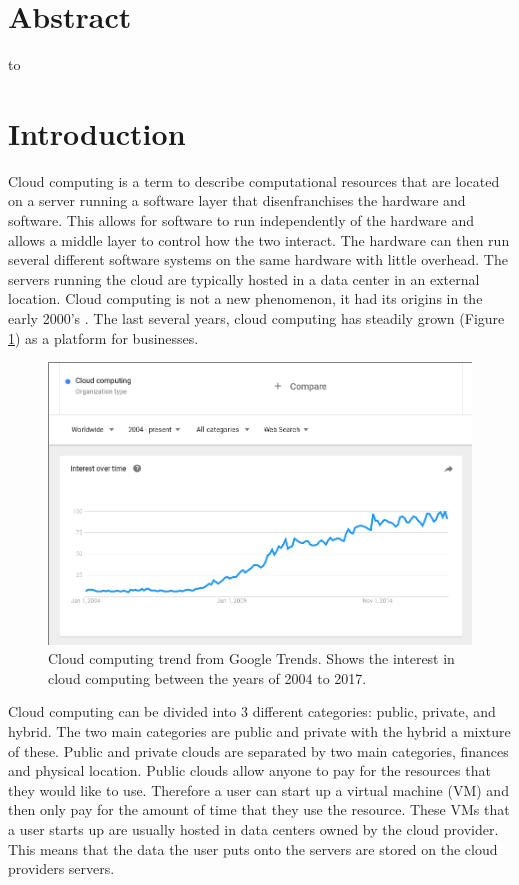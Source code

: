 \documentclass[12pt]{article}
\begin{document}

\newpage
\tableofcontents
\newpage

\section{Abstract}
to

\section{Introduction}
Cloud computing is a term to describe computational resources that are located on a server running a software layer that disenfranchises the hardware and software. This allows for software to run independently of the hardware and allows a middle layer to control how the two interact. The hardware can then run several different software systems on the same hardware with little overhead. The servers running the cloud are typically hosted in a data center in an external location.  Cloud computing is not a new phenomenon\cite{rochwerger2009reservoir}, it had its origins in the early 2000's \cite{rochwerger2009reservoir}. The last several years, cloud computing has steadily grown (Figure \ref{fig:CloudTrendGoogle}) as a platform for businesses.

\begin{figure}[ht]
    \centering
    \includegraphics[scale=.3]{./pic/2017-06-14-130823_923x615_scrot.png}
    \caption{Cloud computing trend from Google Trends. Shows the interest in cloud computing between the years of 2004 to 2017. \cite{GoogleTrendsCloud}}
    \label{fig:CloudTrendGoogle}
\end{figure}

Cloud computing can be divided into 3 different categories: public, private, and hybrid.  The two main categories are public and private with the hybrid a mixture of these. Public and private clouds are separated by two main categories, finances and physical location. Public clouds allow anyone to pay for the resources that they would like to use. Therefore a user can start up a virtual machine (VM) and then only pay for the amount of time that they use the resource. These VMs that a user starts up are usually hosted in data centers owned by the cloud provider. This means that the data the user puts onto the servers are stored on the cloud providers servers.
\end{document}
